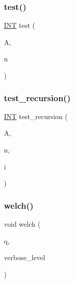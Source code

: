 \mbox{\label{costas_8_c_a19b6864eaeff2e2424ca297158651278}} 
\subsubsection{\texorpdfstring{test()}{test()}}
{\footnotesize\ttfamily \mbox{\hyperlink{galois_8h_a09fddde158a3a20bd2dcadb609de11dc}{I\+NT}} test (\begin{DoxyParamCaption}\item[{\mbox{\hyperlink{galois_8h_a09fddde158a3a20bd2dcadb609de11dc}{I\+NT}} $\ast$}]{A,  }\item[{\mbox{\hyperlink{galois_8h_a09fddde158a3a20bd2dcadb609de11dc}{I\+NT}}}]{n }\end{DoxyParamCaption})}

\mbox{\label{costas_8_c_a2874dd7912bd978eaf022da0b45e301b}} 
\subsubsection{\texorpdfstring{test\+\_\+recursion()}{test\_recursion()}}
{\footnotesize\ttfamily \mbox{\hyperlink{galois_8h_a09fddde158a3a20bd2dcadb609de11dc}{I\+NT}} test\+\_\+recursion (\begin{DoxyParamCaption}\item[{\mbox{\hyperlink{galois_8h_a09fddde158a3a20bd2dcadb609de11dc}{I\+NT}} $\ast$}]{A,  }\item[{\mbox{\hyperlink{galois_8h_a09fddde158a3a20bd2dcadb609de11dc}{I\+NT}}}]{n,  }\item[{\mbox{\hyperlink{galois_8h_a09fddde158a3a20bd2dcadb609de11dc}{I\+NT}}}]{i }\end{DoxyParamCaption})}

\mbox{\label{costas_8_c_a1be7f35236ad96218a7433ee282d50a8}} 
\subsubsection{\texorpdfstring{welch()}{welch()}}
{\footnotesize\ttfamily void welch (\begin{DoxyParamCaption}\item[{\mbox{\hyperlink{galois_8h_a09fddde158a3a20bd2dcadb609de11dc}{I\+NT}}}]{q,  }\item[{\mbox{\hyperlink{galois_8h_a09fddde158a3a20bd2dcadb609de11dc}{I\+NT}}}]{verbose\+\_\+level }\end{DoxyParamCaption})}



